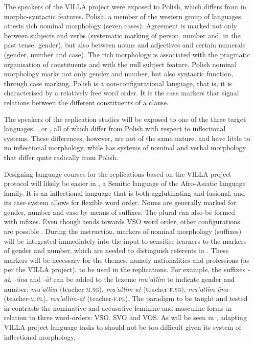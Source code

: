\documentclass[output=paper,colorlinks,citecolor=brown,modfonts,nonflat]{../langscibook}
\begin{document}
The  speakers of the VILLA project were exposed to Polish, which differs from  in morpho-syntactic features. Polish, a member of the western group of  languages, attests rich nominal morphology (seven cases). Agreement is marked not only between subjects and verbs (systematic marking of person, number and, in the past tense, gender), but also between nouns and adjectives and certain numerals (gender, number and case). The rich morphology is associated with the pragmatic organisation of constituents and with the null subject feature. Polish nominal morphology marks not only gender and number, but also syntactic function, through case marking. Polish is a non-configurational language, that is, it is characterised by a relatively free word order. It is the case markers that signal relations between the different constituents of a clause.

The  speakers of the replication studies will be exposed to one of the three target languages, ,  or , all of which differ from Polish with respect to inflectional systems. These differences, however, are not of the same nature.  and  have little to no inflectional morphology, while  has systems of nominal and verbal morphology that differ quite radically from Polish.

Designing language courses for the replications based on the VILLA project protocol will likely be easier in , a {Semitic} language of the {Afro-Asiatic} language family. It is an inflectional language that is both agglutinating and fusional, and its case system allows for flexible word order.  Nouns are generally marked for gender, number and case by means of suffixes. The plural can also be formed with infixes. Even though  tends towards VSO word order, other configurations are possible \citep{Ryding2005}. During the  instruction, markers of nominal morphology (suffixes) will be integrated immediately into the input to sensitise learners to the markers of gender and number, which are needed to distinguish referents in . These markers will be necessary for the themes, namely nationalities and professions (as per the VILLA project), to be used in the replications. For example, the suffixes \textit{{}-at}, \textit{{}-ūna} and \textit{{}-āt} can be added to the lexeme \textit{mu’allim} to indicate gender and number: \textit{mu’allim} (teacher-\textsc{m.sg}), \textit{mu’allim-at} (teacher-\textsc{f.sg}), \textit{mu’allim-ūna} (teacher-\textsc{m.pl}), \textit{mu’allim-āt} (teacher-\textsc{f.pl}). The paradigm to be taught and tested in  contrasts the nominative and accusative feminine and masculine forms in relation to three word-orders: VSO, SVO and VOS. As will be seen in , adapting VILLA project language tasks to  should not be too difficult given its system of inflectional morphology.
\end{document}
